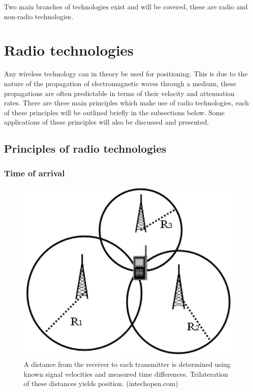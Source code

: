 \documentclass[11pt,a4paper]{report}
\begin{document}
	Two main branches of technologies exist and will be covered, these are radio and non-radio technologies.
	
	\section{Radio technologies}
		Any wireless technology can in theory be used for positioning. This is due to the nature of the propagation of electromagnetic waves through a medium, these propagations are often predictable in terms of their velocity and attenuation rates. There are three main principles which make use of radio technologies, each of these principles will be outlined briefly in the subsections below. Some applications of these principles will also be discussed and presented.
	
	\subsection{Principles of radio technologies}
		\subsubsection{Time of arrival}
			\begin{figure}[H]
				\centering
				\includegraphics[width=1\textwidth]{time_of_arrival}
				\caption[Time of arrival]{A distance from the receiver to each transmitter is determined using known signal velocities and measured time differences. Trilateration of these distances yields position. (intechopen.com)}
				\label{fig:time_of_arrival}
			\end{figure}
			
\end{document}
